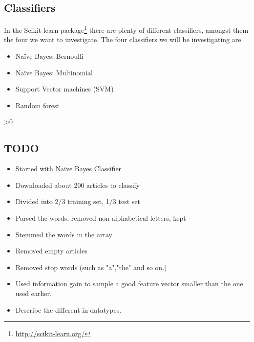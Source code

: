 \subsection{Classifiers}
In the Scikit-learn package\footnote{\url{http://scikit-learn.org/}} there are plenty of different classifiers, amongst them the four we want to investigate. The four classifiers we will be investigating are
\begin{itemize}[noitemsep,nolistsep]
\item Naïve Bayes: Bernoulli
\item Naïve Bayes: Multinomial
\item Support Vector machines (SVM)
\item Random forest 
\end{itemize}

\ifnum\printdraft>0
\subsection{TODO}
\begin{itemize}
\item Started with Naïve Bayes Classifier
\item Downloaded about 200 articles to classify
\item Divided into 2/3 training set, 1/3 test set
\item Parsed the words, removed non-alphabetical letters, kept -
\item Stemmed the words in the array
\item Removed empty articles
\item Removed stop words (such as "a","the" and so on.)
\item Used information gain to sample a good feature vector smaller than the one used earlier.
\item Describe the different in-datatypes.
\end{itemize}
\fi
